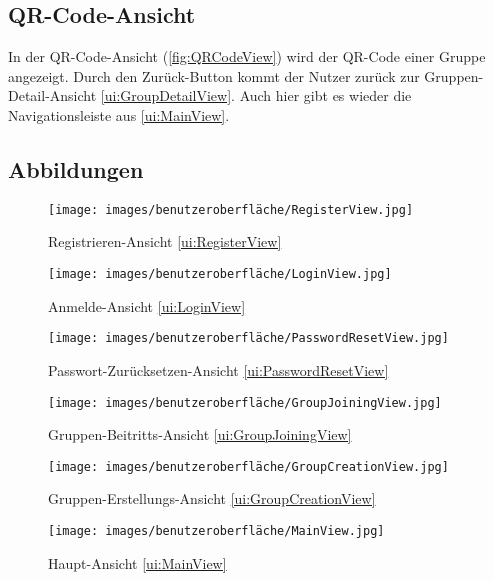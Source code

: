 \documentclass[parskip=full]{scrartcl}
\begin{document}
\subsection{QR-Code-Ansicht}
\label{ui:QRCodeView}
In der QR-Code-Ansicht (\autoref{fig:QRCodeView}) wird der QR-Code einer Gruppe angezeigt. Durch den Zurück-Button kommt der Nutzer zurück zur Gruppen-Detail-Ansicht \ref{ui:GroupDetailView}. Auch hier gibt es wieder die Navigationsleiste aus \ref{ui:MainView}.
\newpage

\subsection*{Abbildungen}
\begin{figure}[htp]
    \begin{minipage}
        [t]{0.49\textwidth}
        \centering
        \texttt{[image: images/benutzeroberfläche/RegisterView.jpg]}
        \caption{Registrieren-Ansicht \ref{ui:RegisterView}}
        \label{fig:RegisterView}
    \end{minipage}
    \begin{minipage}
        [t]{0.49\textwidth}
        \centering
        \texttt{[image: images/benutzeroberfläche/LoginView.jpg]}
        \caption{Anmelde-Ansicht \ref{ui:LoginView}}
        \label{fig:LoginView}
    \end{minipage}
\end{figure}
\begin{figure}[htp]
    \begin{minipage}
        [t]{0.49\textwidth}
        \centering
        \texttt{[image: images/benutzeroberfläche/PasswordResetView.jpg]}
        \caption{Passwort-Zurücksetzen-Ansicht \ref{ui:PasswordResetView}}
        \label{fig:PasswordResetView}
    \end{minipage}
    \begin{minipage}
        [t]{0.49\textwidth}
        \centering
        \texttt{[image: images/benutzeroberfläche/GroupJoiningView.jpg]}
        \caption{Gruppen-Beitritts-Ansicht \ref{ui:GroupJoiningView}}
        \label{fig:GroupJoiningView}
    \end{minipage}
\end{figure}
\begin{figure}[htp]
    \begin{minipage}
        [t]{0.49\textwidth}
        \centering
        \texttt{[image: images/benutzeroberfläche/GroupCreationView.jpg]}
        \caption{Gruppen-Erstellungs-Ansicht \ref{ui:GroupCreationView}}
        \label{fig:GroupCreationView}
    \end{minipage}
    \begin{minipage}
        [t]{0.49\textwidth}
        \centering
        \texttt{[image: images/benutzeroberfläche/MainView.jpg]}
        \caption{Haupt-Ansicht \ref{ui:MainView}}
        \label{fig:MainView}
    \end{minipage}
\end{figure}
\end{document}
